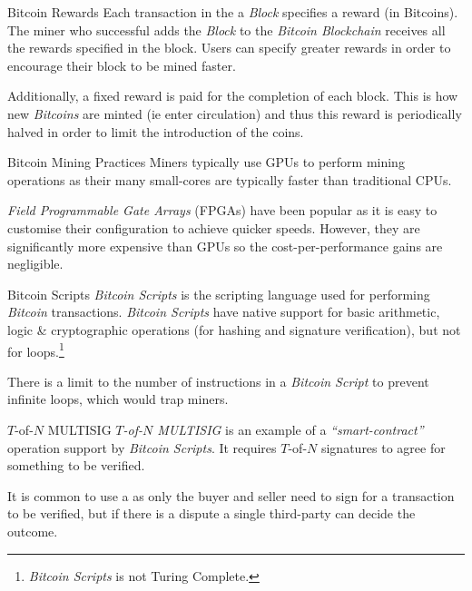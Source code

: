 \documentclass[11pt,a4paper]{article}
\begin{document}
  \begin{remark}{Bitcoin Rewards}
    Each transaction in the a \textit{Block} specifies a reward (in Bitcoins). The miner who successful adds the \textit{Block} to the \textit{Bitcoin Blockchain} receives all the rewards specified in the block. Users can specify greater rewards in order to encourage their block to be mined faster.
    \par Additionally, a fixed reward is paid for the completion of each block. This is how new \textit{Bitcoins} are minted (ie enter circulation) and thus this reward is periodically halved in order to limit the introduction of the coins.
  \end{remark}

  \begin{remark}{Bitcoin Mining Practices}
    Miners typically use GPUs to perform mining operations as their many small-cores are typically faster than traditional CPUs.
    \par \textit{Field Programmable Gate Arrays} (FPGAs) have been popular as it is easy to customise their configuration to achieve quicker speeds. However, they are significantly more expensive than GPUs so the cost-per-performance gains are negligible.
  \end{remark}

  \begin{definition}{Bitcoin Scripts}
    \textit{Bitcoin Scripts} is the scripting language used for performing \textit{Bitcoin} transactions. \textit{Bitcoin Scripts} have native support for basic arithmetic, logic \& cryptographic operations (for hashing and signature verification), but not for loops.\footnote{\textit{Bitcoin Scripts} is not Turing Complete.}
    \par There is a limit to the number of instructions in a \textit{Bitcoin Script} to prevent infinite loops, which would trap miners.
  \end{definition}

  \begin{proposition}{$T$-of-$N$ MULTISIG}
    \textit{$T$-of-$N$ MULTISIG} is an example of a \textit{``smart-contract''} operation support by \textit{Bitcoin Scripts}. It requires $T$-of-$N$ signatures to agree for something to be verified.
    \par It is common to use a  as only the buyer and seller need to sign for a transaction to be verified, but if there is a dispute a single third-party can decide the outcome.
  \end{proposition}
\end{document}
